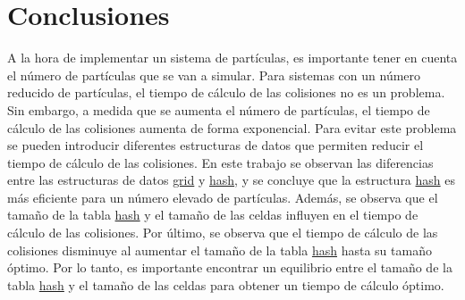 \documentclass{article}
\begin{document}
\newpage
\section{Conclusiones}\label{sec:conclusion}

A la hora de implementar un sistema de partículas, es importante tener en cuenta el número de partículas que se van a simular. Para sistemas con un número reducido de partículas, el tiempo de cálculo de las colisiones no es un problema. Sin embargo, a medida que se aumenta el número de partículas, el tiempo de cálculo de las colisiones aumenta de forma exponencial. Para evitar este problema se pueden introducir diferentes estructuras de datos que permiten reducir el tiempo de cálculo de las colisiones. En este trabajo se observan las diferencias entre las estructuras de datos \hyperref[sec:grid]{grid} y \hyperref[sec:hash]{hash}, y se concluye que la estructura \hyperref[sec:hash]{hash} es más eficiente para un número elevado de partículas. Además, se observa que el tamaño de la tabla \hyperref[sec:hash]{hash} y el tamaño de las celdas influyen en el tiempo de cálculo de las colisiones. Por último, se observa que el tiempo de cálculo de las colisiones disminuye al aumentar el tamaño de la tabla \hyperref[sec:hash]{hash} hasta su tamaño óptimo. Por lo tanto, es importante encontrar un equilibrio entre el tamaño de la tabla \hyperref[sec:hash]{hash} y el tamaño de las celdas para obtener un tiempo de cálculo óptimo.
\end{document}
